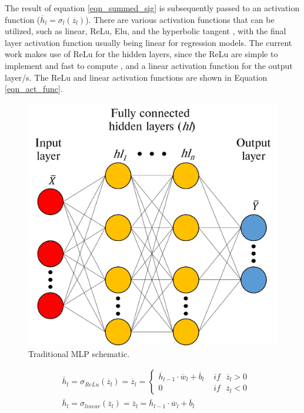 \documentclass[a4paper,fleqn]{cas-sc}
\begin{document}
The result of equation \ref{eqn_summed_sig} is subsequently passed to an activation function ($\overline{h}_l = \sigma_l(\overline{z}_l)$). There are various activation functions that can be utilized, such as linear, ReLu, Elu, and the hyperbolic tangent \citep{goodfellow}, with the final layer activation function usually being linear for regression models. The current work makes use of ReLu for the hidden layers, since the ReLu are simple to implement and fast to compute \cite{Wheeler2019}, and a linear activation function for the output layer/s. The ReLu and linear activation functions are shown in Equation \ref{eqn_act_func}.
\begin{figure}[h!]
	\centering
		\includegraphics[scale=0.5]{ML_SCHEMATIC}
	  \caption{Traditional MLP schematic.}\label{fig_mlp_schematic}
\end{figure}
\begin{equation}\label{eqn_act_func}
\begin{split}
&\overline{h}_l=\sigma_{ReLu}(\overline{z}_l) = \overline{z}_l =  
	\begin{cases}
	 \overline{h}_{l-1}\cdot\overline{w}_l+\overline{b}_l\,\, &if\,\,\,\, \overline{z}_l>0\\
	 0\,\, &if\,\,\,\, \overline{z}_l<0
	\end{cases}\\
&\overline{h}_l=\sigma_{linear}(\overline{z}_l) = \overline{z}_l = \overline{h}_{l-1}\cdot\overline{w}_l+\overline{b}_l
\end{split}
\end{equation}
\end{document}
